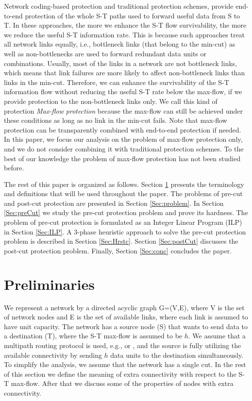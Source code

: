 \documentclass[conference]{IEEEtran}
\begin{document}
Network coding-based protection and traditional protection schemes, provide end-to-end protection of the whole S-T paths used to forward useful data from S to T. In these approaches, the more we enhance the S-T flow survivability, the more we reduce the useful S-T information rate. This is because such approaches treat all network links equally, i.e., bottleneck links (that belong to the min-cut) as well as non-bottlenecks are used to forward redundant data units or combinations. Usually, most of the links in a network are not bottleneck links, which means that link failures are more likely to affect non-bottleneck links than links in the min-cut. Therefore, we can enhance the survivability of the S-T information flow without reducing the useful S-T rate below the max-flow, if we provide protection to the non-bottleneck links only. We call this kind of protection \emph{Max-flow protection} because the max-flow can still be achieved under these conditions as long as no link in the min-cut fails. Note that max-flow protection can be transparently combined with end-to-end protection if needed. In this paper, we focus our analysis on the problem of max-flow protection only, and we do not consider combining it with traditional protection schemes. To the best of our knowledge the problem of max-flow protection has not been studied before. 

The rest of this paper is organized as follows. Section \ref{Sec:prelim} presents the terminology and definitions that will be used throughout the paper. The problems of pre-cut and post-cut protection are presented in Section \ref{Sec:problem}. In Section \ref{Sec:preCut} we study the pre-cut protection problem and prove its hardness. The problem of pre-cut protection is formulated as an Integer Linear Program (ILP) in Section \ref{Sec:ILP}. A 3-phase heuristic approach to solve the pre-cut protection problem is described in Section \ref{Sec:Hrstc}. Section \ref{Sec:postCut} discusses the post-cut protection problem. Finally, Section \ref{Sec:conc} concludes the paper.


\section{Preliminaries}
\label{Sec:prelim}

We represent a network by a directed acyclic graph G=(V,E), where V is the set of network nodes and E is the set of available links, where each link is assumed to have unit capacity. The network has a source node (S) that wants to send data to a destination (T), where the S-T max-flow is assumed to be $h$. We assume that a multipath routing protocol is used, e.g., \cite{SJ01} or \cite{MS01}, and the source is fully utilizing the available connectivity by sending $h$ data units to the destination simultaneously. To simplify the analysis, we assume that the network has a single cut. In the rest of this section we define the meaning of extra connectivity with respect to the S-T max-flow. After that we discuss some of the properties of nodes with extra connectivity.
\end{document}
